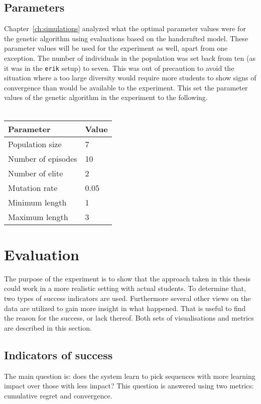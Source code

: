 \subsection{Parameters}
\label{sec:setup_params}
Chapter~\ref{ch:simulations} analyzed what the optimal parameter values were
for the genetic algorithm using evaluations based on the handcrafted model.
These parameter values will be used for the experiment as well, apart from one
exception. The number of individuals in the population was set back from ten
(as it was in the \texttt{erik} setup) to seven. This was out of precaution to
avoid the situation where a too large diversity would require more students to
show signs of convergence than would be available to the experiment. This set
the parameter values of the genetic algorithm in the experiment to the
following.\\\\
\begin{tabular}{ll}\hline
	\textbf{Parameter} &  \textbf{Value}\\\hline
	Population size & 7 \\
	Number of episodes & 10 \\
	Number of elite & 2 \\
	Mutation rate & 0.05 \\
	Minimum length & 1 \\
	Maximum length & 3 \\
\end{tabular}

\section{Evaluation}
The purpose of the experiment is to show that the approach taken in this thesis
could work in a more realistic setting with actual students. To determine that,
two types of success indicators are used. Furthermore several other views on
the data are utilized to gain more insight in what happened. That is useful to
find the reason for the success, or lack thereof. Both sets of visualisations
and metrics are described in this section.
\subsection{Indicators of success}
The main question is: does the system learn to pick sequences with
more learning impact over those with less impact? This
question is answered using two metrics: cumulative regret and convergence.
